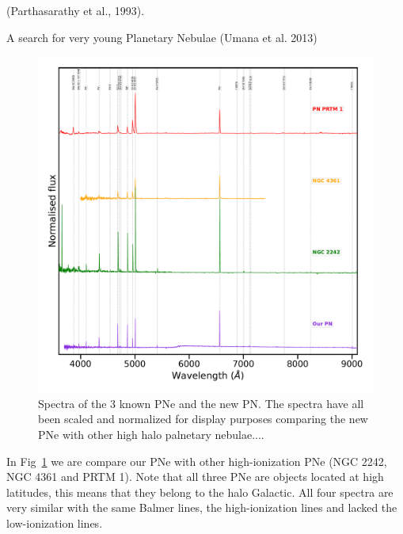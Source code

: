 \documentclass[fleqn,usenatbib]{mnras}
\begin{document}
(Parthasarathy et al., 1993). {\cs A search for very young Planetary Nebulae (Umana et al.
  2013)


\newpage
\begin{figure}
\centering
\includegraphics[width=0.89\linewidth]{Figs/spectra-compare.pdf}
  \caption{Spectra of the 3 known PNe and the new PN. The spectra have all been scaled and normalized for display purposes comparing the new PNe with other high halo palnetary nebulae....} 
  \label{fig:compare-spectra}
\end{figure}

In Fig~\ref{fig:compare-spectra} we are compare our PNe with other high-ionization PNe (NGC 2242, NGC 4361 and PRTM 1).
Note that all three PNe are objects located at high latitudes, this means that they belong to the halo Galactic.
All four spectra are very similar with the same Balmer lines, the high-ionization lines and lacked the low-ionization lines.

}
\end{document}
